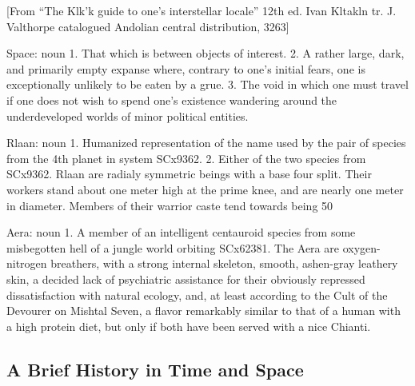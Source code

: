 [From “The Klk’k guide to one’s interstellar locale” 12th ed. Ivan Kltakln tr. J. Valthorpe  
catalogued Andolian central distribution, 3263]

Space: noun
1. That which is between objects of interest.
2. A rather large, dark, and primarily empty expanse where, contrary to one’s initial fears, one is exceptionally unlikely to be eaten by a grue.
3. The void in which one must travel if one does not wish to spend one’s existence wandering around the underdeveloped worlds of minor political entities.

Rlaan: noun
1. Humanized representation of the name used by the pair of species from the 4th planet in system SCx9362.
2.	Either of the two species from SCx9362. Rlaan are radialy symmetric beings with a base four split. Their workers stand about one meter high at the prime knee, and are nearly one meter in diameter. Members of their warrior caste tend towards being 50%

Aera: noun
1. 	A member of an intelligent centauroid species from some misbegotten hell of a jungle world orbiting SCx62381. The Aera are oxygen-nitrogen breathers, with a strong internal skeleton, smooth, ashen-gray leathery skin, a decided lack of psychiatric assistance for their obviously repressed dissatisfaction with natural ecology, and, at least according to the Cult of the Devourer on Mishtal Seven, a flavor remarkably similar to that of a human with a high protein diet, but only if both have been served with a nice Chianti. 

\subsection{A Brief History in Time and Space}

